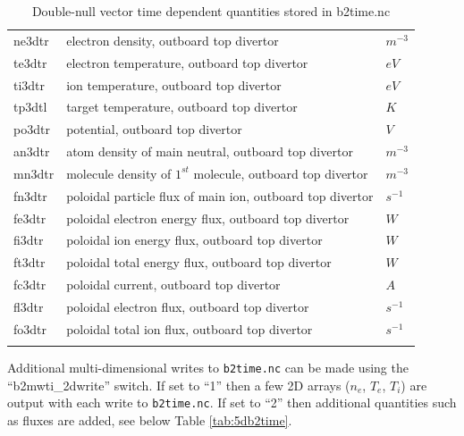 \documentclass[a4paper,10pt]{report}
\begin{document}
\begin{center}
\begin{longtable}{|l|l|l|}
ne3dtr \index{ne3dtr}\index{b2time.nc, ne3dtr} & electron density, outboard top divertor & $m^{-3}$ \\
te3dtr \index{te3dtr}\index{b2time.nc, te3dtr} & electron temperature, outboard top divertor & $eV$ \\
ti3dtr \index{ti3dtr}\index{b2time.nc, ti3dtr} & ion temperature, outboard top divertor & $eV$ \\
tp3dtl \index{tp3dtl}\index{b2time.nc, tp3dtl} & target temperature, outboard top divertor & $K $ \\
po3dtr \index{po3dtr}\index{b2time.nc, po3dtr} & potential, outboard top divertor & $V $ \\
an3dtr \index{an3dtr}\index{b2time.nc, an3dtr} & atom density of main neutral, outboard top divertor & $m^{-3}$ \\
mn3dtr \index{mn3dtr}\index{b2time.nc, mn3dtr} & molecule density of $1^{st}$ molecule, outboard top divertor & $m^{-3}$ \\
fn3dtr \index{fn3dtr}\index{b2time.nc, fn3dtr} & poloidal particle flux of main ion, outboard top divertor & $s^{-1}$ \\
fe3dtr \index{fe3dtr}\index{b2time.nc, fe3dtr} & poloidal electron energy flux, outboard top divertor & $W $ \\
fi3dtr \index{fi3dtr}\index{b2time.nc, fi3dtr} & poloidal ion energy flux, outboard top divertor & $W $ \\
ft3dtr \index{ft3dtr}\index{b2time.nc, ft3dtr} & poloidal total energy flux, outboard top divertor & $W $ \\
fc3dtr \index{fc3dtr}\index{b2time.nc, fc3dtr} & poloidal current, outboard top divertor  & $A $ \\
fl3dtr \index{fl3dtr}\index{b2time.nc, fl3dtr} & poloidal electron flux, outboard top divertor & $s^{-1}$ \\
fo3dtr \index{fo3dtr}\index{b2time.nc, fo3dtr} & poloidal total ion flux, outboard top divertor & $s^{-1}$ \\
    \hline
    \caption{Double-null vector time dependent quantities stored in b2time.nc}
    \label{tab:4db2time}
  \end{longtable}
\end{center}

Additional multi-dimensional writes to {\tt b2time.nc} can be made using the ``b2mwti\_2dwrite'' switch.
If set to ``1'' then a few 2D arrays ($n_e$, $T_e$, $T_i$) are output with each write to {\tt b2time.nc}. If set
to ``2'' then additional quantities such as fluxes are added, see below Table
\ref{tab:5db2time}.
\end{document}
